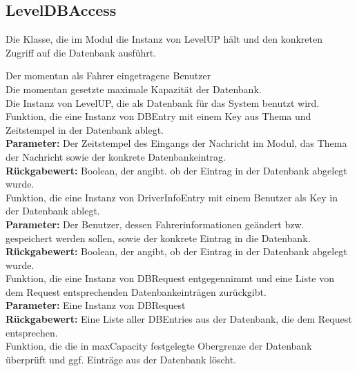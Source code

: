 \documentclass[entwurf.tex]{subfiles}
\begin{document}
	\subsection{LevelDBAccess}
	\label{Class:LevelDBAccess}
	Die Klasse, die im Modul die Instanz von LevelUP hält und den konkreten Zugriff auf die Datenbank ausführt. \\
	\begin{description}
	 Der momentan als Fahrer eingetragene Benutzer \\
	 Die momentan gesetzte maximale Kapazität der Datenbank. \\
	 Die Instanz von LevelUP, die als Datenbank für das System benutzt wird. \\
	
	Funktion, die eine Instanz von DBEntry mit einem Key aus  Thema und Zeitstempel in der Datenbank ablegt. \\
	\textbf{Parameter:} Der Zeitstempel des Eingangs der Nachricht im Modul, das Thema der Nachricht sowie der konkrete Datenbankeintrag. \\
	\textbf{Rückgabewert:} Boolean, der angibt. ob der Eintrag in der Datenbank abgelegt wurde. \\
	
	Funktion, die eine Instanz von DriverInfoEntry mit einem Benutzer als Key in der Datenbank ablegt. \\
	\textbf{Parameter:} Der Benutzer, dessen Fahrerinformationen geändert bzw. gespeichert werden sollen, sowie der konkrete Eintrag in die Datenbank. \\
	\textbf{Rückgabewert:} Boolean, der angibt, ob der Eintrag in der Datenbank abgelegt wurde. \\
	
	Funktion, die eine Instanz von DBRequest entgegennimmt und eine Liste von dem Request entsprechenden Datenbankeinträgen zurückgibt. \\
	\textbf{Parameter:} Eine Instanz von DBRequest \\
	\textbf{Rückgabewert:} Eine Liste aller DBEntries aus der Datenbank, die dem Request entsprechen. \\
	
	Funktion, die die in maxCapacity festgelegte Obergrenze der Datenbank überprüft und ggf. Einträge aus der Datenbank löscht. \\
	\end{description}
	
\end{document}
